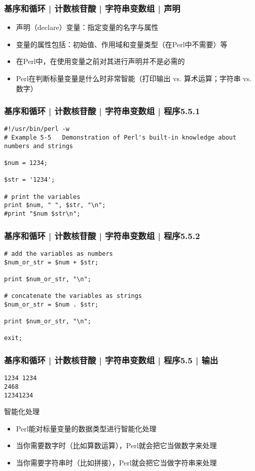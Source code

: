 \begin{frame}[fragile]
  \frametitle{基序和循环 | 计数核苷酸 | 字符串变数组 | 声明}
  \begin{itemize}
    \item 声明（declare）变量：指定变量的名字与属性
    \item 变量的属性包括：初始值、作用域和变量类型（在Perl中不需要）等
    \item 在Perl中，在使用变量之前对其进行声明并不是必需的
    \item Perl在判断标量变量是什么时非常智能（打印输出 vs. 算术运算；字符串 vs. 数字）
  \end{itemize}
\end{frame}

\begin{frame}[fragile]
  \frametitle{基序和循环 | 计数核苷酸 | 字符串变数组 | 程序5.5.1}
\begin{lstlisting}
#!/usr/bin/perl -w
# Example 5-5   Demonstration of Perl's built-in knowledge about numbers and strings

$num = 1234;

$str = '1234';

# print the variables
print $num, " ", $str, "\n";
#print "$num $str\n";
\end{lstlisting}
\end{frame}

\begin{frame}[fragile]
  \frametitle{基序和循环 | 计数核苷酸 | 字符串变数组 | 程序5.5.2}
\begin{lstlisting}[firstnumber=11]
# add the variables as numbers
$num_or_str = $num + $str;

print $num_or_str, "\n";

# concatenate the variables as strings
$num_or_str = $num . $str;

print $num_or_str, "\n";

exit;
\end{lstlisting}
\end{frame}

\begin{frame}[fragile]
  \frametitle{基序和循环 | 计数核苷酸 | 字符串变数组 | 程序5.5 | 输出}
\begin{lstlisting}
1234 1234
2468
12341234
\end{lstlisting}
\pause
\begin{block}{智能化处理}
  \begin{itemize}
    \item Perl能对标量变量的数据类型进行智能化处理
    \item 当你需要数字时（比如算数运算），Perl就会把它当做数字来处理
    \item 当你需要字符串时（比如拼接），Perl就会把它当做字符串来处理
  \end{itemize}
\end{block}
\end{frame}

